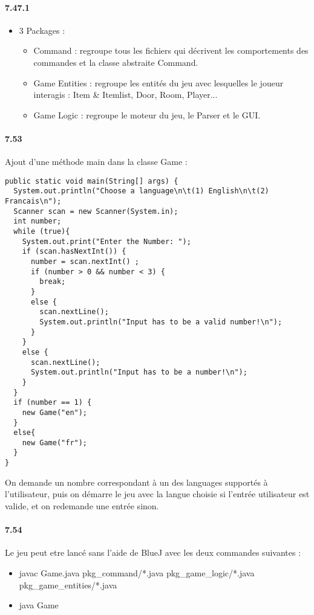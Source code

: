 \documentclass[11pt,a4paper]{report}
\begin{document}
\paragraph{7.47.1}
\begin{itemize}
\item 3 Packages :
\begin{itemize}
\item Command : regroupe tous les fichiers qui décrivent les comportements des commandes et la classe abstraite Command.
\item Game Entities : regroupe les entités du jeu avec lesquelles le joueur interagis : Item \& Itemlist, Door, Room, Player...
\item Game Logic  : regroupe le moteur du jeu, le Parser et le GUI.
\end{itemize}
\end{itemize}

\paragraph{7.53}
Ajout d'une méthode main dans la classe Game :
\begin{lstlisting}
public static void main(String[] args) {
  System.out.println("Choose a language\n\t(1) English\n\t(2) Francais\n");
  Scanner scan = new Scanner(System.in);
  int number;
  while (true){
    System.out.print("Enter the Number: ");
    if (scan.hasNextInt()) {
      number = scan.nextInt() ;
      if (number > 0 && number < 3) {
        break;
      }
      else {
        scan.nextLine();
        System.out.println("Input has to be a valid number!\n");
      }
    }
    else {
      scan.nextLine();
      System.out.println("Input has to be a number!\n");
    }
  }
  if (number == 1) {
    new Game("en");
  }
  else{
    new Game("fr");
  }
}
\end{lstlisting}
On demande un nombre correspondant à un des languages supportés à l'utilisateur, puis on démarre le jeu avec la langue choisie si l'entrée utilisateur est valide, et on redemande une entrée sinon.

\paragraph{7.54}
Le jeu peut etre lancé sans l'aide de BlueJ avec les deux commandes suivantes :
\begin{itemize}
\item javac Game.java pkg\_command/*.java pkg\_game\_logic/*.java pkg\_game\_entities/*.java
\item java Game
\end{itemize}
\end{document}
